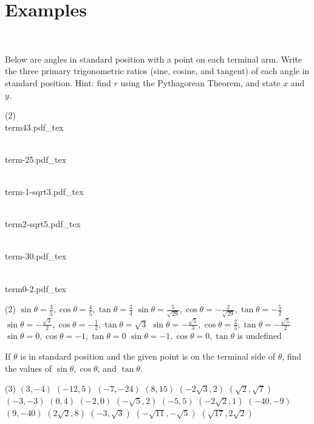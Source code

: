 \documentclass[12pt,fleqn]{book}
\newcommand{\incfig}[2][1]{%
    \def\svgwidth{#1\columnwidth}
    {#2.pdf_tex}
}
\newcommand{\prb}[1]{\begin{Exercise}\parbox[t]{\textwidth-5em}{#1}\end{Exercise}}
\newcommand{\sol}[1]{\begin{Answer}\parbox[t]{\textwidth-5em}{#1}\end{Answer}}
\begin{document}
\section*{Examples}
\clearpage
\ 
\clearpage 
\prb{Below are angles in standard position with a point on each terminal arm.  Write the three primary trigonometric ratios (sine, cosine, and tangent) of each angle in standard position.  Hint: find $r$ using the Pythagorean Theorem, and state $x$ and $y$.
	\begin{tasks}(2)
		\task\\
		\incfig[0.8]{term43}
		\task\\
		\incfig[0.8]{term-25}
		\task\\
		\incfig{term-1-sqrt3}
		\task\\
		\incfig{term2-sqrt5}
		\task\\
		\incfig{term-30}
		\task\\
		\incfig{term0-2}
	\end{tasks}
}
\sol{
	\begin{tasks}(2)
		\task $\sin \theta=\frac{3}{5}, \cos \theta=\frac{4}{5}, \tan \theta=\frac{3}{4}$
		\task $\sin \theta=\frac{5}{\sqrt{29}}, \cos \theta=-\frac{2}{\sqrt{29}}, \tan \theta=-\frac{5}{2}$
		\task $\sin \theta=-\frac{\sqrt{3}}{2}, \cos \theta=-\frac{1}{2}, \tan \theta=\sqrt{3}$
		\task $\sin \theta=-\frac{\sqrt{5}}{3}, \cos \theta=\frac{2}{3}, \tan \theta=-\frac{\sqrt{5}}{2}$
		\task $\sin \theta=0, \cos \theta=-1, \tan \theta=0$
		\task $\sin \theta=-1, \cos \theta=0, \tan \theta$ is undefined
	\end{tasks}
}
\prb{
	If $\theta$ is in standard position and the given point is on the terminal side of $\theta$, find the values of $\sin \theta, \cos \theta$, and $\tan \theta$.
	\begin{tasks}(3)
		\task $(3,-4)$
		\vspace{8.5em}
		\task $(-12,5)$
		\vspace{8.5em}
		\task $(-7,-24)$
		\vspace{8.5em}
		\task $(8,15)$
		\vspace{8.5em}
		\task $(-2 \sqrt{3}, 2)$
		\vspace{8.5em}
		\task $(\sqrt{2}, \sqrt{7})$
		\vspace{8.5em}
		\task $(-3,-3)$
		\vspace{8.5em}
		\task $(0,4)$
		\vspace{8.5em}
		\task $(-2,0)$
		\vspace{8.5em}
		\task $(-\sqrt{5}, 2)$
		\vspace{8.5em}
		\task $(-5,5)$
		\vspace{8.5em}
		\task $(-2 \sqrt{2}, 1)$
		\vspace{8.5em}
		\task $(-40,-9)$
		\vspace{8.5em}
		\task $(9,-40)$
		\vspace{8.5em}
		\task $(2 \sqrt{2}, 8)$
		\vspace{8.5em}
		\task $(-3, \sqrt{3})$
		\vspace{8.5em}
		\task $(-\sqrt{11},-\sqrt{5})$
		\vspace{8.5em}
		\task $(\sqrt{17}, 2 \sqrt{2})$
		\vspace{8.5em}
	\end{tasks}
}
\end{document}

